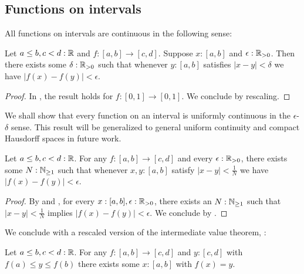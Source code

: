 \subsection{Functions on intervals}
All functions on intervals are continuous in the following sense:
\begin{lemma}\label{continuity}
  Let $a\leq b,c<d:\mathbb{R}$ and $f:[a,b]\to [c,d]$. Suppose $x:[a,b]$ and $\epsilon:\mathbb{R}_{>0}$. Then there exists some $\delta:\mathbb{R}_{>0}$ such that whenever $y:[a,b]$ satisfies $|x-y|<\delta$ we have $|f(x) -f(y)| < \epsilon$. 
\end{lemma}
\begin{proof}
  In \parencite[Thm 4.28]{synthetic-stone-duality}, the result holds for $f:[0,1]\to[0,1]$. We conclude by rescaling. 
\end{proof}
We shall show that every function on an interval is uniformly continuous in the $\epsilon$-$\delta$ sense. This result will be generalized to general uniform continuity and compact Hausdorff spaces in future work. 
\begin{corollary}\label{UniformContinuity}
  Let $a\leq b,c<d:\mathbb{R}$. For any $f:[a,b] \to [c,d]$ and every $\epsilon:\mathbb{R}_{>0}$, there exists some $N:\mathbb{N}_{\geq1}$ such that whenever $x,y:[a,b]$ satisfy $|x-y|<\frac1N$ we have $|f(x) -f(y)| < \epsilon$. 
\end{corollary}
\begin{proof}
  By  and , for every $x:[a,b],\epsilon:\mathbb{R}_{>0}$, there exists an $N:\mathbb{N}_{\geq1}$ such that $|x-y|<\frac1N$ implies $|f(x)-f(y)|<\epsilon$. We conclude by .
\end{proof} 

We conclude with a rescaled version of the intermediate value theorem, \parencite[Thm 5.29]{synthetic-stone-duality}:
\begin{theorem}\label{IntermediateValue}
  Let $a\leq b,c<d:\mathbb{R}$.
  For any $f:[a,b]\to[c,d]$ and $y:[c,d]$ with $f(a)\leq y \leq f(b)$ there exists some $x:[a,b]$ with $f(x) = y$. 
\end{theorem}

